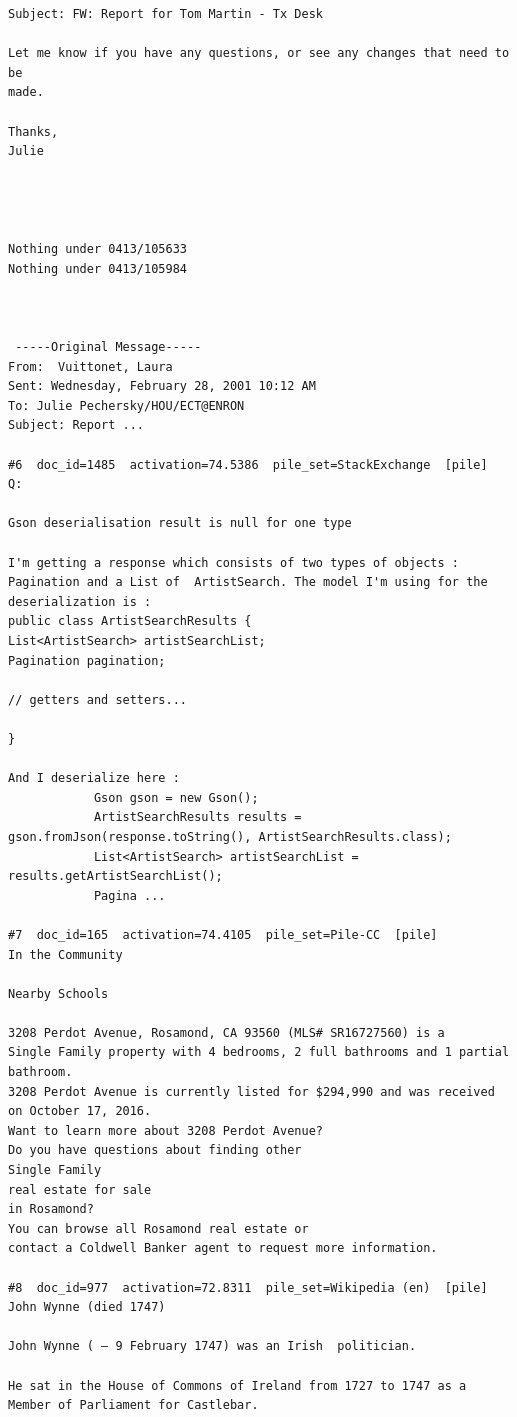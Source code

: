 \begin{verbatim}
Subject: FW: Report for Tom Martin - Tx Desk

Let me know if you have any questions, or see any changes that need to be 
made.

Thanks,
Julie




Nothing under 0413/105633
Nothing under 0413/105984



 -----Original Message-----
From:  Vuittonet, Laura  
Sent: Wednesday, February 28, 2001 10:12 AM
To: Julie Pechersky/HOU/ECT@ENRON
Subject: Report ...

#6  doc_id=1485  activation=74.5386  pile_set=StackExchange  [pile]
Q:

Gson deserialisation result is null for one type

I'm getting a response which consists of two types of objects : Pagination and a List of  ArtistSearch. The model I'm using for the deserialization is : 
public class ArtistSearchResults {
List<ArtistSearch> artistSearchList;
Pagination pagination;

// getters and setters...

}

And I deserialize here : 
            Gson gson = new Gson();
            ArtistSearchResults results = gson.fromJson(response.toString(), ArtistSearchResults.class);
            List<ArtistSearch> artistSearchList = results.getArtistSearchList();
            Pagina ...

#7  doc_id=165  activation=74.4105  pile_set=Pile-CC  [pile]
In the Community

Nearby Schools

3208 Perdot Avenue, Rosamond, CA 93560 (MLS# SR16727560) is a
Single Family property with 4 bedrooms, 2 full bathrooms and 1 partial bathroom.
3208 Perdot Avenue is currently listed for $294,990 and was received on October 17, 2016.
Want to learn more about 3208 Perdot Avenue?
Do you have questions about finding other
Single Family
real estate for sale
in Rosamond?
You can browse all Rosamond real estate or
contact a Coldwell Banker agent to request more information.

#8  doc_id=977  activation=72.8311  pile_set=Wikipedia (en)  [pile]
John Wynne (died 1747)

John Wynne ( – 9 February 1747) was an Irish  politician.

He sat in the House of Commons of Ireland from 1727 to 1747 as a Member of Parliament for Castlebar.


\end{verbatim}
